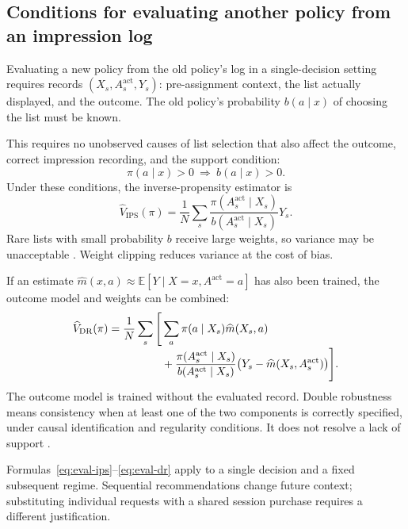 \documentclass[12pt,a4paper]{article}
\newcommand{\E}{\mathbb E}
\theoremstyle{plainru}
\begin{document}
\subsection{Conditions for evaluating another policy from an impression log}
\label{sec:eval-ope}

Evaluating a new policy from the old policy's log in a single-decision setting
requires records $(X_s,A_s^{\mathrm{act}},Y_s)$: pre-assignment context,
the list actually displayed, and the outcome. The old policy's probability
$b(a\mid x)$ of choosing the list must be known.

This requires no unobserved causes of list selection that also affect the outcome,
correct impression recording, and the support condition:
\begin{equation}\label{eq:eval-support}
 \pi(a\mid x)>0\ \Longrightarrow\ b(a\mid x)>0.
\end{equation}
Under these conditions, the inverse-propensity estimator is
\begin{equation}\label{eq:eval-ips}
 \widehat V_{\mathrm{IPS}}(\pi)
 =\frac1N\sum_s
  \frac{\pi(A_s^{\mathrm{act}}\mid X_s)}
       {b(A_s^{\mathrm{act}}\mid X_s)}Y_s.
\end{equation}
Rare lists with small probability $b$ receive large weights,
so variance may be unacceptable \cite{ips}.
Weight clipping reduces variance at the cost of bias.

If an estimate
$\widehat m(x,a)\approx\E[Y\mid X=x,A^{\mathrm{act}}=a]$
has also been trained, the outcome model and weights can be combined:
\begin{align}
 \widehat V_{\mathrm{DR}}(\pi)
 =\frac1N\sum_s\Bigg[&\sum_a\pi(a\mid X_s)\widehat m(X_s,a)
 \notag\\[-0.2em]
 &+\frac{\pi(A_s^{\mathrm{act}}\mid X_s)}
       {b(A_s^{\mathrm{act}}\mid X_s)}
       \bigl(Y_s-\widehat m(X_s,A_s^{\mathrm{act}})\bigr)\Bigg].
 \label{eq:eval-dr}
\end{align}
The outcome model is trained without the evaluated record. Double robustness
means consistency when at least one of the two
components is correctly specified, under causal identification and regularity conditions.
It does not resolve a lack of support \cite{dr}.

Formulas~\eqref{eq:eval-ips}--\eqref{eq:eval-dr} apply to a single decision
and a fixed subsequent regime. Sequential recommendations
change future context; substituting individual requests with a shared
session purchase requires a different justification.
\end{document}
